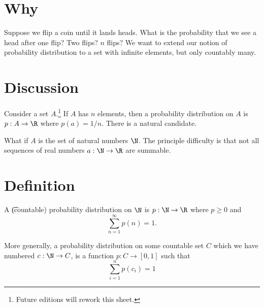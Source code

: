 
\section*{Why}

Suppose we flip a coin until it lands heads.
What is the probability that we see a head after one flip?
Two flips?
$n$ flips?
We want to extend our notion of probability distribution to a set with infinite elements, but only countably many.

\section*{Discussion}

Consider a set $A$.\footnote{Future editions will rework this sheet.}
If $A$ has $n$ elements, then a probability distribution on $A$ is $p: A \to \R $ where $p(a) = 1/n$.
There is a natural candidate.

What if $A$ is the set of natural numbers $\N  $.
The principle difficulty is that not all sequences
of real numbers $a: \N   \to \R $ are summable.

\section*{Definition}

A \t{(countable) probability distribution} on $\N  $ is $p: \N \to \R $ where $p \geq 0$ and
\[
\textstyle
\sum_{n =1}^{\infty} p(n) = 1.
\]

More generally, a probability distribution on some countable set $C$ which we have numbered $c: \N   \to C$, is a function $p: C \to [0,1]$ such that
\[
\sum_{i = 1}^{n} p(c_i) = 1
\]

\blankpage